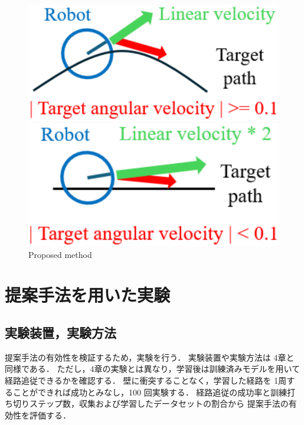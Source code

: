 \documentclass{jarticle}
\begin{document}
\begin{figure}[htbp]
  \begin{minipage}[t]{0.5\linewidth}
    \centering
    \includegraphics[keepaspectratio, scale=0.34]{./pdf/a2.pdf}
  \end{minipage}
  \begin{minipage}[t]{0.5\linewidth}
    \centering
    \includegraphics[keepaspectratio, scale=0.34]{./pdf/b.pdf}
  \end{minipage}
  \caption{Proposed method}
  \label{fig:10}
\end{figure}


\section{提案手法を用いた実験}

\subsection{実験装置，実験方法}
提案手法の有効性を検証するため，実験を行う．
実験装置や実験方法は 4章と同様である．
ただし，4章の実験とは異なり，学習後は訓練済みモデルを用いて経路追従できるかを確認する．
壁に衝突することなく，学習した経路を 1周することができれば成功とみなし，100 回実験する．
経路追従の成功率と訓練打ち切りステップ数，収集および学習したデータセットの割合から
提案手法の有効性を評価する．
\end{document}

